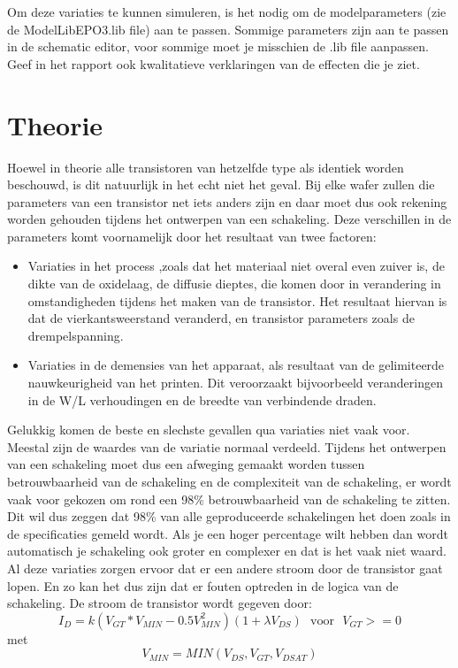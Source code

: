 \documentclass{article}
\begin{document}
Om deze variaties te kunnen simuleren, is het nodig om de modelparameters (zie de ModelLibEPO3.lib
ﬁle) aan te passen. Sommige parameters zijn aan te passen in de schematic editor, voor sommige moet je
misschien de .lib ﬁle aanpassen. Geef in het rapport ook kwalitatieve verklaringen van de effecten die je
ziet.

\section{Theorie}

Hoewel in theorie alle transistoren van hetzelfde type als identiek worden beschouwd, is dit natuurlijk in het echt niet het geval. 
Bij elke wafer zullen die parameters van een transistor net iets anders zijn en daar moet dus ook rekening worden gehouden tijdens het ontwerpen van een schakeling. Deze verschillen in de parameters komt voornamelijk door het resultaat van twee factoren:
\newline
\begin {itemize}
	\item Variaties in het process ,zoals dat het materiaal niet overal even zuiver is, de dikte van de oxidelaag, de diffusie dieptes, die komen door in verandering in omstandigheden tijdens het maken van de transistor. Het resultaat hiervan is dat de vierkantsweerstand veranderd, en transistor parameters zoals de drempelspanning.
	\item Variaties in de demensies van het apparaat, als resultaat van de gelimiteerde nauwkeurigheid van het printen. Dit veroorzaakt bijvoorbeeld veranderingen in de W/L verhoudingen en de breedte van verbindende draden.
\end {itemize}

Gelukkig komen de beste en slechste gevallen qua variaties niet vaak voor. Meestal zijn de waardes van de variatie normaal verdeeld. 
Tijdens het ontwerpen van een schakeling moet dus een afweging gemaakt worden tussen betrouwbaarheid van de schakeling en de complexiteit van de schakeling, er wordt vaak voor gekozen om rond een 98\% betrouwbaarheid van de schakeling te zitten. Dit wil dus zeggen dat 98\% van alle geproduceerde schakelingen het doen zoals in de specificaties gemeld wordt. Als je een hoger percentage wilt hebben dan wordt automatisch je schakeling ook groter en complexer en dat is het vaak niet waard.\\
Al deze variaties zorgen ervoor dat er een andere stroom door de transistor gaat lopen. En zo kan het dus zijn dat er fouten optreden in de logica van de schakeling. De stroom de transistor wordt gegeven door:
\newline
\begin {equation}
	I_D = k(V_{GT}*V_{MIN} - 0.5V_{MIN}^2)(1+\lambda V_{DS})    \mathrm{~~~voor~~~}    V_{GT}>= 0
\end {equation}
 met 
\begin {equation}
	V_{MIN} = MIN(V_{DS},V_{GT},V_{DSAT})
\end {equation}
\end{document}
